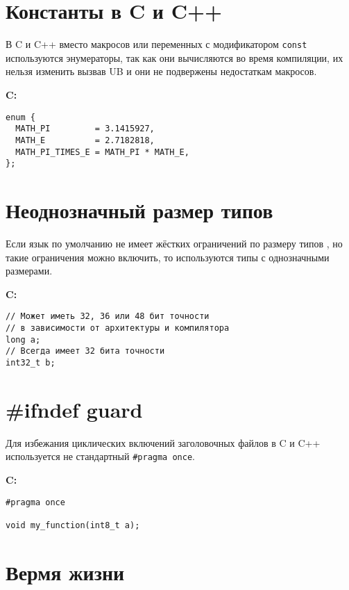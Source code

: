 \documentclass[12p]{article}
\begin{document}
\section{Константы в C и C++}

В C и C++ вместо макросов или переменных с модификатором \texttt{const} используются энумераторы, так как они вычисляются во время компиляции, их нельзя изменить вызвав UB и они не подвержены недостаткам макросов.\newline

\textbf{C:}
\begin{verbatim}
enum {
  MATH_PI         = 3.1415927,
  MATH_E          = 2.7182818,
  MATH_PI_TIMES_E = MATH_PI * MATH_E,
};
\end{verbatim}

\section{Неоднозначный размер типов}

Если язык по умолчанию не имеет жёстких ограничений по размеру типов \cite{data_type_sizes}, но такие ограничения можно включить, то используются типы с однозначными размерами.\newline

\textbf{C:}
\begin{verbatim}
// Может иметь 32, 36 или 48 бит точности
// в зависимости от архитектуры и компилятора
long a;
// Всегда имеет 32 бита точности
int32_t b;
\end{verbatim}

\section{\#ifndef guard}

Для избежания циклических включений заголовочных файлов в C и C++ используется не стандартный \texttt{#pragma once}.\newline

\textbf{C:}
\begin{verbatim}
#pragma once

void my_function(int8_t a);
\end{verbatim}
\pagebreak

\section{Вермя жизни}
\end{document}
